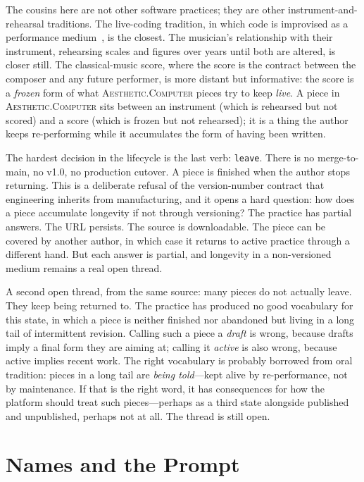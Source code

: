 \documentclass[10pt,letterpaper,twocolumn]{article}
\newcommand{\ac}{\textsc{Aesthetic.Computer}}
\begin{document}
The cousins here are not other software practices; they are other instrument-and-rehearsal traditions. The live-coding tradition, in which code is improvised as a performance medium~\citep{magnusson2010designing}, is the closest. The musician's relationship with their instrument, rehearsing scales and figures over years until both are altered, is closer still. The classical-music score, where the score is the contract between the composer and any future performer, is more distant but informative: the score is a \emph{frozen} form of what \ac{} pieces try to keep \emph{live}. A piece in \ac{} sits between an instrument (which is rehearsed but not scored) and a score (which is frozen but not rehearsed); it is a thing the author keeps re-performing while it accumulates the form of having been written.

The hardest decision in the lifecycle is the last verb: \texttt{leave}. There is no merge-to-main, no v1.0, no production cutover. A piece is finished when the author stops returning. This is a deliberate refusal of the version-number contract that engineering inherits from manufacturing, and it opens a hard question: how does a piece accumulate longevity if not through versioning? The practice has partial answers. The URL persists. The source is downloadable. The piece can be covered by another author, in which case it returns to active practice through a different hand. But each answer is partial, and longevity in a non-versioned medium remains a real open thread.

A second open thread, from the same source: many pieces do not actually leave. They keep being returned to. The practice has produced no good vocabulary for this state, in which a piece is neither finished nor abandoned but living in a long tail of intermittent revision. Calling such a piece a \emph{draft} is wrong, because drafts imply a final form they are aiming at; calling it \emph{active} is also wrong, because active implies recent work. The right vocabulary is probably borrowed from oral tradition: pieces in a long tail are \emph{being told}---kept alive by re-performance, not by maintenance. If that is the right word, it has consequences for how the platform should treat such pieces---perhaps as a third state alongside published and unpublished, perhaps not at all. The thread is still open.

\section{Names and the Prompt}
\end{document}
